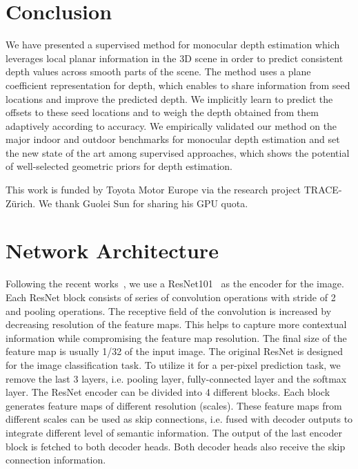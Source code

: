 \documentclass[final]{cvpr}
\newcommand{\PAR}[1]{\vskip2pt \noindent{\bf #1}}
\begin{document}
\section{Conclusion}

We have presented a supervised method for monocular depth estimation which leverages local planar information in the 3D scene in order to predict consistent depth values across smooth parts of the scene. The method uses a plane coefficient representation for depth, which enables to share information from seed locations and improve the predicted depth. We implicitly learn to predict the offsets to these seed locations and to weigh the depth obtained from them adaptively according to accuracy. We empirically validated our method on the major indoor and outdoor benchmarks for monocular depth estimation and set the new state of the art among supervised approaches, which shows the potential of well-selected geometric priors for depth estimation.

\PAR{Acknowledgements.}
This work is funded by Toyota Motor Europe via the research project TRACE-Z\"urich. We thank Guolei Sun for sharing his GPU quota.

{\small


}

\clearpage
\appendix

\section{Network Architecture}
\label{appendix:network}
\PAR{Encoder:}
Following the recent works~\cite{deep:ordinal:regression:network, local:planar:guidance}, we use a ResNet101~\cite{resnet} as the encoder for the image. Each ResNet block consists of series of convolution operations with stride of 2 and pooling operations. The receptive field of the convolution is increased by decreasing resolution of the feature maps. This helps to capture more contextual information while compromising the feature map resolution. The final size of the feature map is usually 1/32 of the input image. The original ResNet is designed for the image classification task. To utilize it for a per-pixel prediction task, we remove the last 3 layers, i.e. pooling layer, fully-connected layer and the softmax layer. The ResNet encoder can be divided into 4 different blocks. Each block generates feature maps of different resolution (scales). These feature maps from different scales can be used as skip connections, i.e. fused with decoder outputs to integrate different level of semantic information. The output of the last encoder block is fetched to both decoder heads. Both decoder heads also receive the skip connection information. 
\end{document}
